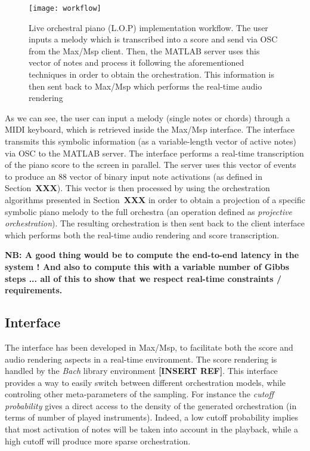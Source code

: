 \documentclass[letterpaper]{article}
\begin{document}
\begin{figure*}
\begin{centering}
\texttt{[image: workflow]}
\par\end{centering}

\caption{\label{fig:Live-orchestral-piano}Live orchestral piano (L.O.P) implementation
workflow. The user inputs a melody which is transcribed into a score
and send via OSC from the Max/Msp client. Then, the MATLAB server
uses this vector of notes and process it following the aforementioned
techniques in order to obtain the orchestration. This information
is then sent back to Max/Msp which performs the real-time audio rendering }
\end{figure*}


As we can see, the user can input a melody (single notes or chords)
through a MIDI keyboard, which is retrieved inside the Max/Msp interface.
The interface transmits this symbolic information (as a variable-length
vector of active notes) via OSC to the MATLAB server. The interface
performs a real-time transcription of the piano score to the screen
in parallel. The server uses this vector of events to produce an 88
vector of binary input note activations (as defined in Section~\textbf{XXX}).
This vector is then processed by using the orchestration algorithms
presented in Section~\textbf{XXX} in order to obtain a projection
of a specific symbolic piano melody to the full orchestra (an operation
defined as \emph{projective orchestration}). The resulting orchestration
is then sent back to the client interface which performs both the
real-time audio rendering and score transcription. 

\textbf{NB: A good thing would be to compute the end-to-end latency
in the system ! And also to compute this with a variable number of
Gibbs steps ... all of this to show that we respect real-time constraints
/ requirements.}


\subsection{Interface}

The interface has been developed in Max/Msp, to facilitate both the
score and audio rendering aspects in a real-time environment. The
score rendering is handled by the \emph{Bach }library environment
\textbf{{[}INSERT REF{]}}. This interface provides a way to easily
switch between different orchestration models, while controling other
meta-parameters of the sampling. For instance the \emph{cutoff probability
}gives a direct access to the density of the generated orchestration
(in terms of number of played instruments). Indeed, a low cutoff probability
implies that most activation of notes will be taken into account in
the playback, while a high cutoff will produce more sparse orchestration.
\end{document}
